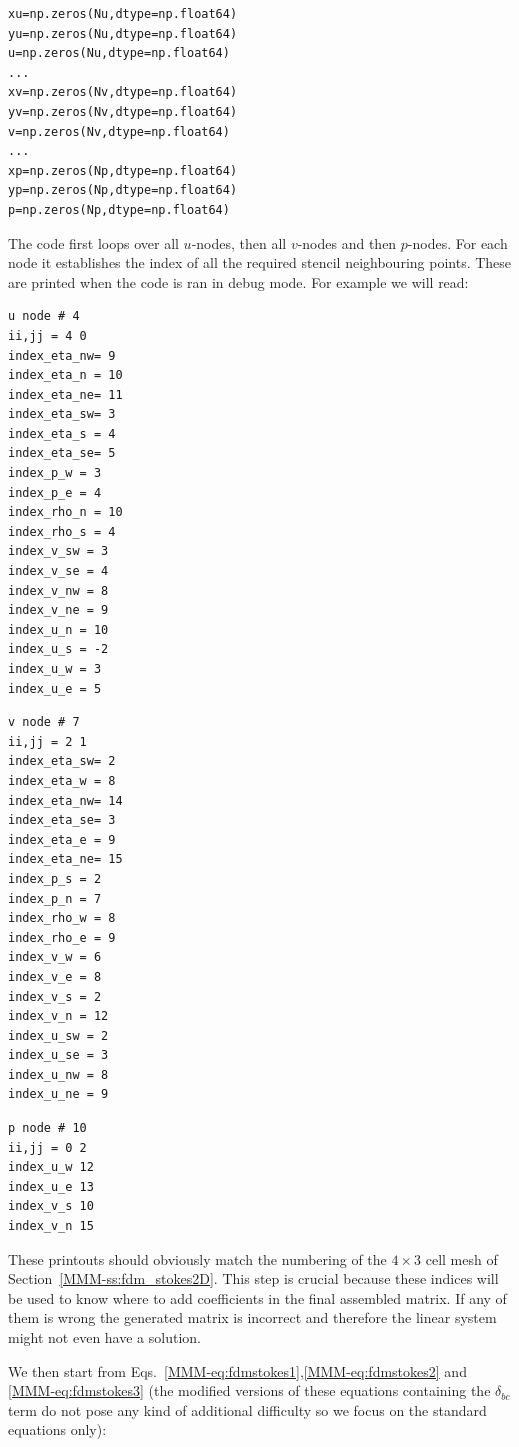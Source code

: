 \begin{lstlisting}
xu=np.zeros(Nu,dtype=np.float64)
yu=np.zeros(Nu,dtype=np.float64)
u=np.zeros(Nu,dtype=np.float64)
...
xv=np.zeros(Nv,dtype=np.float64)
yv=np.zeros(Nv,dtype=np.float64)
v=np.zeros(Nv,dtype=np.float64)
...
xp=np.zeros(Np,dtype=np.float64)
yp=np.zeros(Np,dtype=np.float64)
p=np.zeros(Np,dtype=np.float64)
\end{lstlisting}

The code first loops over all $u$-nodes, then all $v$-nodes
and then $p$-nodes. For each node it establishes the index
of all the required stencil neighbouring points.
These are printed when the code is ran in debug mode.
For example we will read:


\begin{multicols}{3}

\begin{verbatim}
u node # 4
ii,jj = 4 0
index_eta_nw= 9
index_eta_n = 10
index_eta_ne= 11
index_eta_sw= 3
index_eta_s = 4
index_eta_se= 5
index_p_w = 3
index_p_e = 4
index_rho_n = 10
index_rho_s = 4
index_v_sw = 3
index_v_se = 4
index_v_nw = 8
index_v_ne = 9
index_u_n = 10
index_u_s = -2
index_u_w = 3
index_u_e = 5
\end{verbatim}
\columnbreak
\begin{verbatim}
v node # 7
ii,jj = 2 1
index_eta_sw= 2
index_eta_w = 8
index_eta_nw= 14
index_eta_se= 3
index_eta_e = 9
index_eta_ne= 15
index_p_s = 2
index_p_n = 7
index_rho_w = 8
index_rho_e = 9
index_v_w = 6
index_v_e = 8
index_v_s = 2
index_v_n = 12
index_u_sw = 2
index_u_se = 3
index_u_nw = 8
index_u_ne = 9
\end{verbatim}
\columnbreak

\begin{verbatim}
p node # 10
ii,jj = 0 2
index_u_w 12
index_u_e 13
index_v_s 10
index_v_n 15
\end{verbatim}

\end{multicols}
These printouts should obviously match the numbering of the $4\times 3$ cell mesh
of Section~\ref{MMM-ss:fdm_stokes2D}.
This step is crucial because these indices will be used to know
where to add coefficients in the final assembled matrix. 
If any of them is wrong the generated matrix is incorrect and therefore the linear system
might not even have a solution. 

We then start from Eqs.~\eqref{MMM-eq:fdmstokes1},\eqref{MMM-eq:fdmstokes2} and 
\eqref{MMM-eq:fdmstokes3} 
(the modified versions of these equations containing the $\delta_{bc}$ term do not pose
any kind of additional difficulty so we focus on the standard equations only):


